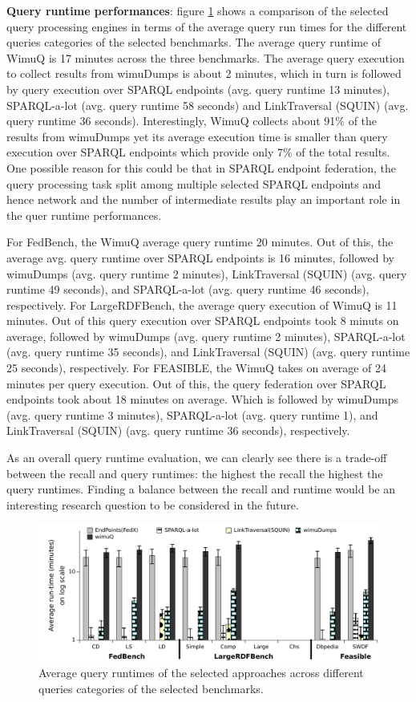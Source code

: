 \textbf{Query runtime performances}: 
figure \ref{fig:runtime1} shows a comparison of the selected query processing engines in terms of the average query run times for the different queries categories of the selected benchmarks. The average query runtime of WimuQ is 17 minutes across the three benchmarks. The average query execution to collect results from wimuDumps is about 2 minutes, which in turn is followed by query execution over SPARQL endpoints (avg. query runtime 13 minutes), SPARQL-a-lot (avg. query runtime 58 seconds) and LinkTraversal (SQUIN) (avg. query runtime 36 seconds). Interestingly, WimuQ collects about 91\% of the results from wimuDumps yet its average execution time is smaller than query execution over SPARQL endpoints which provide only 7\%  of the total results. One possible reason for this could be that in SPARQL endpoint federation, the query processing task split among multiple selected SPARQL endpoints and hence network and the number of intermediate results play an important role in the quer runtime performances. 

For FedBench, the WimuQ average query runtime 20 minutes. Out of this, the average avg. query runtime over SPARQL endpoints is 16 minutes, followed by wimuDumps (avg. query runtime 2 minutes), LinkTraversal (SQUIN) (avg. query runtime 49 seconds), and SPARQL-a-lot (avg. query runtime 46 seconds), respectively. For LargeRDFBench, the average query execution of WimuQ is 11 minutes. Out of this query execution over SPARQL endpoints took 8 minuts on average, followed by wimuDumps (avg. query runtime 2 minutes), SPARQL-a-lot (avg. query runtime 35 seconds), and LinkTraversal (SQUIN) (avg. query runtime 25 seconds), respectively. For FEASIBLE, the WimuQ takes on average of 24 minutes per query execution. Out of this, the query federation over SPARQL endpoints took about 18 minutes on average. Which is followed by wimuDumps (avg. query runtime 3 minutes), SPARQL-a-lot (avg. query runtime 1), and LinkTraversal (SQUIN) (avg. query runtime 36 seconds), respectively.

As an overall query runtime evaluation, we can clearly see there is a trade-off between the recall and query runtimes: the highest the recall the highest the query runtimes. Finding a balance between the recall and runtime would be an interesting research question to be considered in the future.  

\begin{figure}[htb]
    \includegraphics[width=\linewidth]{img/runtime1Min.pdf}
	\caption{Average query runtimes of the selected approaches across different queries categories of the selected benchmarks.}
	\label{fig:runtime1}
\end{figure}


